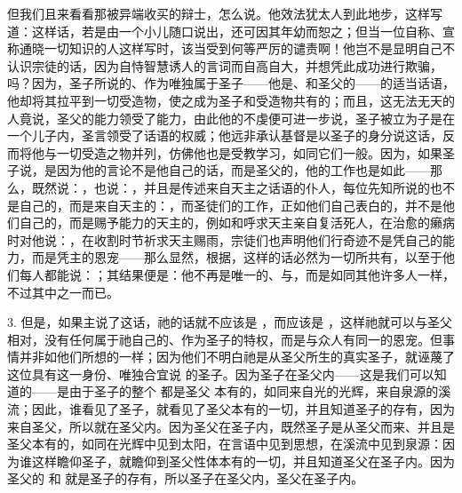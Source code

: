 但我们且来看看那被异端收买的辩士，怎么说。他效法犹太人到此地步，这样写道：这样话，若是由一个小儿随口说出，还可因其年幼而恕之；但当一位自称、宣称通晓一切知识的人这样写时，该当受到何等严厉的谴责啊！他岂不是显明自己不认识宗徒的话，因为自恃智慧诱人的言词而自高自大，并想凭此成功进行欺骗，吗？因为，圣子所说的、作为唯独属于圣子——他是、和圣父的——的适当话语，他却将其拉平到一切受造物，使之成为圣子和受造物共有的；而且，这无法无天的人竟说，圣父的能力领受了能力，由此他的不虔便可进一步说，圣子被立为子是在一个儿子内，圣言领受了话语的权威；他远非承认基督是以圣子的身分说这话，反而将他与一切受造之物并列，仿佛他也是受教学习，如同它们一般。因为，如果圣子说，是因为他的言论不是他自己的话，而是圣父的，他的工作也是如此——那么，既然说：，也说：，并且是传述来自天主之话语的仆人，每位先知所说的也不是自己的，而是来自天主的：，而圣徒们的工作，正如他们自己表白的，并不是他们自己的，而是赐予能力的天主的，例如和呼求天主亲自复活死人，在治愈的癞病时对他说：，在收割时节祈求天主赐雨，宗徒们也声明他们行奇迹不是凭自己的能力，而是凭主的恩宠——那么显然，根据，这样的话必然为一切所共有，以至于他们每人都能说：；其结果便是：他不再是唯一的、与，而是如同其他许多人一样，不过其中之一而已。\par

3. 但是，如果主说了这话，祂的话就不应该是 ，而应该是 ，这样祂就可以与圣父相对，没有任何属于祂自己的、作为圣子的特权，而是与众人有同一的恩宠。但事情并非如他们所想的一样；因为他们不明白祂是从圣父所生的真实圣子，就诬蔑了这位具有这一身份、唯独合宜说  的圣子。因为圣子在圣父内——这是我们可以知道的——是由于圣子的整个  都是圣父  本有的，如同来自光的光辉，来自泉源的溪流；因此，谁看见了圣子，就看见了圣父本有的一切，并且知道圣子的存有，因为来自圣父，所以就在圣父内。因为圣父在圣子内，既然圣子是从圣父而来、并且是圣父本有的，如同在光辉中见到太阳，在言语中见到思想，在溪流中见到泉源：因为谁这样瞻仰圣子，就瞻仰到圣父性体本有的一切，并且知道圣父在圣子内。因为圣父的  和  就是圣子的存有，所以圣子在圣父内，圣父在圣子内。\par

